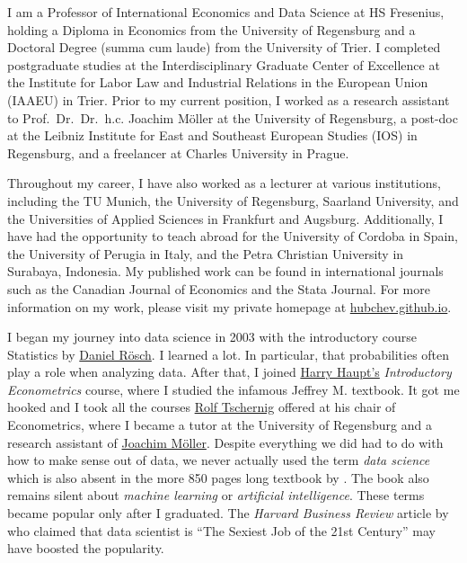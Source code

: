 \documentclass[
  12pt,
  oneside]{book}
\begin{document}
I am a Professor of International Economics and Data Science at HS Fresenius, holding a Diploma in Economics from the University of Regensburg and a Doctoral Degree (summa cum laude) from the University of Trier. I completed postgraduate studies at the Interdisciplinary Graduate Center of Excellence at the Institute for Labor Law and Industrial Relations in the European Union (IAAEU) in Trier. Prior to my current position, I worked as a research assistant to Prof.~Dr.~Dr.~h.c. Joachim Möller at the University of Regensburg, a post-doc at the Leibniz Institute for East and Southeast European Studies (IOS) in Regensburg, and a freelancer at Charles University in Prague.

Throughout my career, I have also worked as a lecturer at various institutions, including the TU Munich, the University of Regensburg, Saarland University, and the Universities of Applied Sciences in Frankfurt and Augsburg. Additionally, I have had the opportunity to teach abroad for the University of Cordoba in Spain, the University of Perugia in Italy, and the Petra Christian University in Surabaya, Indonesia. My published work can be found in international journals such as the Canadian Journal of Economics and the Stata Journal. For more information on my work, please visit my private homepage at \href{www.hubchev.github.io}{hubchev.github.io}.

I began my journey into data science in 2003 with the introductory course Statistics by \href{https://scholar.google.com/citations?user=geLs3JUAAAAJ\&hl=en}{Daniel Rösch}. I learned a lot. In particular, that probabilities often play a role when analyzing data. After that, I joined \href{https://scholar.google.ca/citations?user=tHNB7wIAAAAJ\&hl=en}{Harry Haupt's} \emph{Introductory Econometrics} course, where I studied the infamous Jeffrey M. \citet{Wooldridge2002Introductory} textbook. It got me hooked and I took all the courses \href{https://www.uni-regensburg.de/business-economics-and-management-information-systems/economics-tschernig/team/rolf-tschernig/index.html}{Rolf Tschernig} offered at his chair of Econometrics, where I became a tutor at the University of Regensburg and a research assistant of \href{https://iab.de/en/employee/m\%C3\%B6ller-joachim/}{Joachim Möller}. Despite everything we did had to do with how to make sense out of data, we never actually used the term \emph{data science} which is also absent in the more 850 pages long textbook by \citet{Wooldridge2002Introductory}. The book also remains silent about \emph{machine learning} or \emph{artificial intelligence}. These terms became popular only after I graduated. The \emph{Harvard Business Review} article by \citet{Davenport2012Data} who claimed that data scientist is ``The Sexiest Job of the 21st Century'' may have boosted the popularity.
\end{document}
